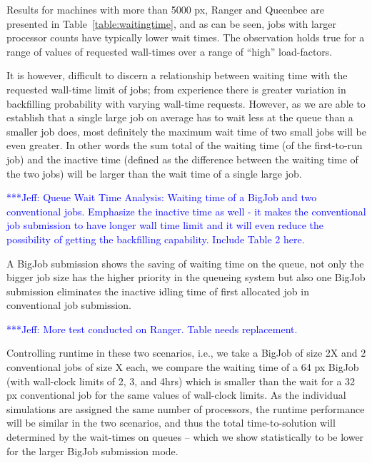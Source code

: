 \documentclass[preprint,12pt]{elsarticle}
\newcommand{\skonote}[1]{ {\textcolor{blue} { ***Jeff: #1 }}}
\newcommand{\skonote}[1]{}
\begin{document}
Results for machines with more than 5000 px, Ranger and Queenbee are presented in Table~\ref{table:waitingtime}, and as can be seen, jobs with larger processor counts have typically lower wait times. The observation holds true for a range of values of requested wall-times over a range of ``high'' load-factors.

It is however, difficult to discern a relationship between waiting time with the requested wall-time limit of jobs; from experience there is greater variation in backfilling probability with varying wall-time requests.  However, as we are able to establish that a single large job on average has to wait less at the queue than a smaller job does, most definitely the maximum wait time of two small jobs will be even greater. In other words the sum total of the waiting time (of the first-to-run job) and the inactive time (defined as the difference between the waiting time of the two jobs) will be larger than the wait time of a single large job.


\skonote{Queue Wait Time Analysis: Waiting time of a BigJob and two conventional jobs. Emphasize the inactive time as well - it makes the conventional job submission to have longer wall time limit and it will even reduce the possibility of getting the backfilling capability. Include Table 2 here.}

A BigJob submission shows the saving of waiting time on the queue, not only the bigger job size has the higher priority in the queueing system but also one BigJob submission eliminates the inactive idling time of first allocated job in conventional job submission.

\skonote{More test conducted on Ranger. Table needs replacement.}

Controlling runtime in these two scenarios, i.e., we take a BigJob of size 2X and 2 conventional jobs of size X each, we compare the waiting time of a 64 px BigJob (with wall-clock limits of 2, 3, and 4hrs) which is smaller than the wait for a 32 px conventional job for the same values of wall-clock limits. As the individual simulations are assigned the same number of processors, the runtime performance will be similar in the two scenarios, and thus the total time-to-solution will determined by the wait-times on queues -- which we show statistically to be lower for the larger BigJob submission mode.
\end{document}
